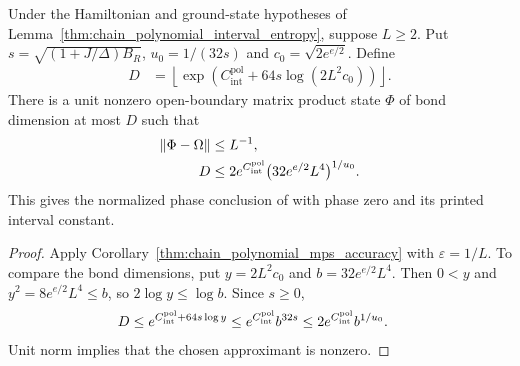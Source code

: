\begin{corollary}
    \label{thm:chain_polynomial_mps_printed_bound}
    \leanok
    Under the Hamiltonian and ground-state hypotheses of
    Lemma~\ref{thm:chain_polynomial_interval_entropy}, suppose $L\ge2$.
    Put $s=\sqrt{(1+J/\Delta)B_R}$, $u_0=1/(32s)$ and
    $c_0=\sqrt{2e^{e/2}}$. Define
    \begin{align}
        D & =\left\lfloor\exp\left(C_{\mathrm{int}}^{\mathrm{pol}}
        +64s\log(2L^2c_0)\right)\right\rfloor.
        \label{eq:chain_polynomial_mps_dimension}
    \end{align}
    There is a unit nonzero open-boundary matrix product state $\Phi$
    of bond dimension at most $D$ such that
    \begin{align}
        \|\Phi-\Omega\| & \le L^{-1},\notag                       \\
        D               & \le2e^{C_{\mathrm{int}}^{\mathrm{pol}}}
        \bigl(32e^{e/2}L^4\bigr)^{1/u_0}.
        \label{eq:chain_polynomial_mps_printed_bound}
    \end{align}
    This gives the normalized phase conclusion of
    \cite[Part~IIa, Theorem~B]{TNLean2026OneDimensional} with phase zero
    and its printed interval constant.
\end{corollary}
\begin{proof}
    \leanok
    Apply Corollary~\ref{thm:chain_polynomial_mps_accuracy} with
    $\varepsilon=1/L$. To compare the bond dimensions, put
    $y=2L^2c_0$ and $b=32e^{e/2}L^4$. Then $0<y$ and
    $y^2=8e^{e/2}L^4\le b$, so $2\log y\le\log b$. Since $s\ge0$,
    \begin{align}
        D & \le e^{C_{\mathrm{int}}^{\mathrm{pol}}+64s\log y}
        \le e^{C_{\mathrm{int}}^{\mathrm{pol}}}b^{32s}
        \le2e^{C_{\mathrm{int}}^{\mathrm{pol}}}b^{1/u_0}.\notag
    \end{align}
    Unit norm implies that the chosen approximant is nonzero.
\end{proof}

